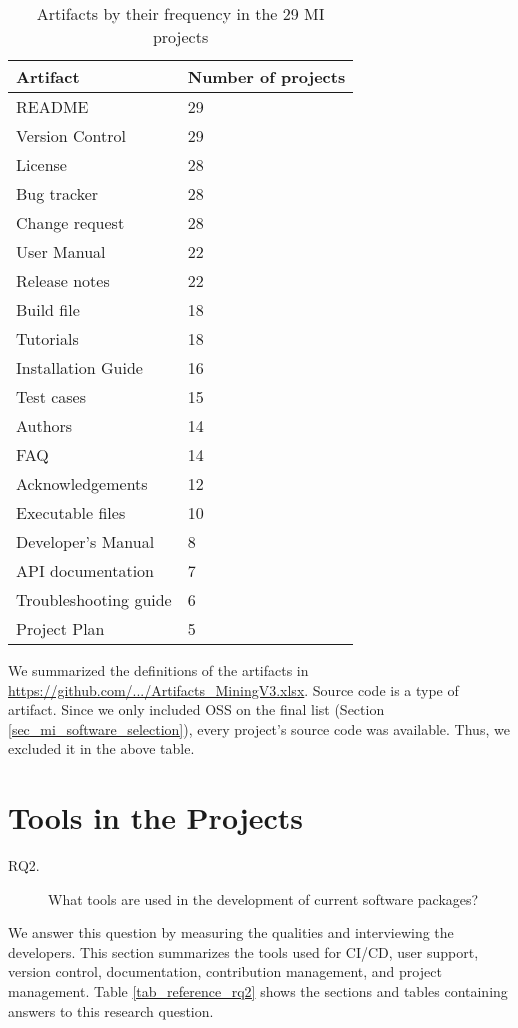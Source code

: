 \begin{table}[H]
\centering
\begin{tabular}{ll}
\hline
Artifact & Number of projects \\ \hline
README & 29 \\
Version Control & 29 \\
License & 28 \\
Bug tracker & 28 \\
Change request & 28 \\
User Manual & 22 \\
Release notes & 22 \\
Build file & 18 \\
Tutorials & 18 \\
Installation Guide & 16 \\
Test cases & 15 \\
Authors & 14 \\
FAQ & 14 \\
Acknowledgements & 12 \\
Executable files & 10 \\
Developer's Manual & 8 \\
API documentation & 7 \\
Troubleshooting guide & 6 \\
Project Plan & 5 \\ \hline
\end{tabular}
\caption{\label{tab_artifacts_frequency}Artifacts by their frequency in the 29 MI projects}
\end{table}

We summarized the definitions of the artifacts in \hyperlink{https://github.com/smiths/AIMSS/blob/master/StateOfPractice/Methodology/Artifacts_MiningV3.xlsx}{https://github.com/.../Artifacts\_MiningV3.xlsx}. Source code is a type of artifact. Since we only included OSS on the final list (Section \ref{sec_mi_software_selection}), every project's source code was available. Thus, we excluded it in the above table.

\section{Tools in the Projects}
\label{sec_rq_tools}
\begin{description}
\item[RQ2.] What tools are used in the development of current software packages?
\end{description}

We answer this question by measuring the qualities and interviewing the developers. This section summarizes the tools used for CI/CD, user support, version control, documentation, contribution management, and project management. Table \ref{tab_reference_rq2} shows the sections and tables containing answers to this research question.

